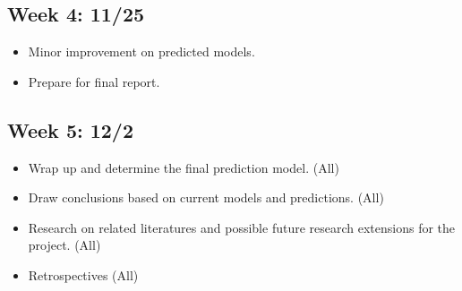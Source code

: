 \documentclass[english]{article}
\begin{document}
\subsection*{Week 4: 11/25}

\begin{itemize}
    \item Minor improvement on predicted models.
    \item Prepare for final report.

\end{itemize}

\subsection*{Week 5: 12/2}

\begin{itemize}
    \item Wrap up and determine the final prediction model. (All)
    \item Draw conclusions based on current models and predictions. (All)
    \item Research on related literatures and possible future research extensions for the project. (All)
    \item Retrospectives (All)

\end{itemize}











\newpage



\end{document}
